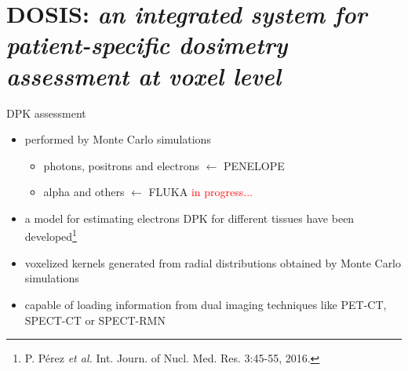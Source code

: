 \documentclass[ignorenonframetext,]{beamer}
\providecommand{\tightlist}{%
  \setlength{\itemsep}{0pt}\setlength{\parskip}{0pt}}
\begin{document}
\hypertarget{dosis-an-integrated-system-for-patient-specific-dosimetry-assessment-at-voxel-level}{%
\section{\texorpdfstring{DOSIS: \emph{an integrated system for
patient-specific dosimetry assessment at voxel
level}}{DOSIS: an integrated system for patient-specific dosimetry assessment at voxel level}}\label{dosis-an-integrated-system-for-patient-specific-dosimetry-assessment-at-voxel-level}}

\begin{frame}{DPK assessment}
\protect\hypertarget{dpk-assessment}{}

\begin{itemize}
\item
  performed by Monte Carlo simulations

  \begin{itemize}
  \tightlist
  \item
    photons, positrons and electrons \(\leftarrow\) PENELOPE
  \item
    alpha and others \(\leftarrow\) FLUKA
    \textcolor{red}{in progress...}
  \end{itemize}
\item
  a model for estimating electrons DPK for different tissues have been
  developed\footnote{P. Pérez {\it et al.} Int. Journ. of Nucl. Med. Res. 3:45-55, 2016.}
\item
  voxelized kernels generated from radial distributions obtained by
  Monte Carlo simulations
\item
  capable of loading information from dual imaging techniques like
  PET-CT, SPECT-CT or SPECT-RMN
\end{itemize}

\end{frame}
\end{document}
